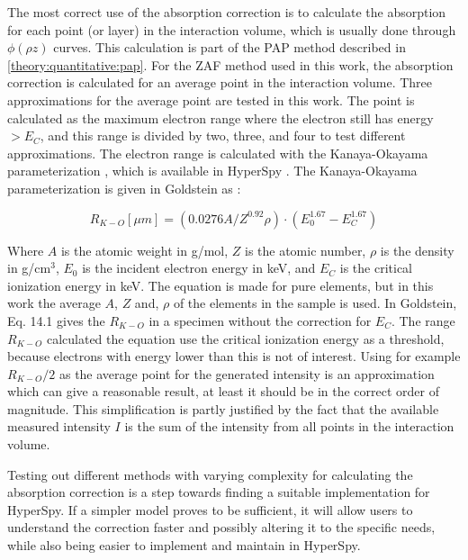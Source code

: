 

The most correct use of the absorption correction is to calculate the absorption for each point (or layer) in the interaction volume, which is usually done through $\phi(\rho z)$ curves.
This calculation is part of the PAP method described in \cref{theory:quantitative:pap}.
For the ZAF method used in this work, the absorption correction is calculated for an average point in the interaction volume.
Three approximations for the average point are tested in this work. 
The point is calculated as the maximum electron range where the electron still has energy $> E_C$, and this range is divided by two, three, and four to test different approximations.
The electron range is calculated with the Kanaya-Okayama parameterization \cite{kanaya1972}, which is available in HyperSpy \cite{hyperspy_1.7.1}.
The Kanaya-Okayama parameterization is given in Goldstein as \cite[22.5]{goldstein_scanning_2018}:

\begin{equation}
    \label{eq:theory:quantitative:kanaya_okayama}
    R_{K-O} [\mu m] = (0.0276 A / Z ^{0.92} \rho) \cdot (E_0^{1.67} - E_C^{1.67})
\end{equation}

Where $A$ is the atomic weight in g/mol, $Z$ is the atomic number, $\rho$ is the density in g/cm$^3$, $E_0$ is the incident electron energy in keV, and $E_C$ is the critical ionization energy in keV.
The equation is made for pure elements, but in this work the average $A$, $Z$ and, $\rho$ of the elements in the sample is used.
In Goldstein, Eq. 14.1 gives the $R_{K-O}$ in a specimen without the correction for $E_C$.
The range $R_{K-O}$ calculated the equation use the critical ionization energy as a threshold, because electrons with energy lower than this is not of interest.
Using for example $R_{K-O}/2$ as the average point for the generated intensity is an approximation which can give a reasonable result, at least it should be in the correct order of magnitude.
This simplification is partly justified by the fact that the available measured intensity $I$ is the sum of the intensity from all points in the interaction volume.


Testing out different methods with varying complexity for calculating the absorption correction is a step towards finding a suitable implementation for HyperSpy.
If a simpler model proves to be sufficient, it will allow users to understand the correction faster and possibly altering it to the specific needs, while also being easier to implement and maintain in HyperSpy.












